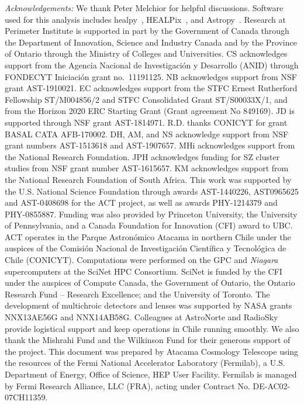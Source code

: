 \documentclass[preprint2]{aastex63}
\begin{document}
{\it{Acknowledgements:}} We thank Peter Melchior for helpful discussions.
Software used for this analysis includes healpy~\citep{Healpix1}, HEALPix~\citep{Healpix2}, and Astropy~\citep{astropy:2013, astropy:2018}.
Research at Perimeter Institute is supported in part by the Government of Canada through the Department of Innovation, Science and Industry Canada and by the Province of Ontario through the Ministry of Colleges and Universities. CS acknowledges support from the Agencia Nacional de Investigaci\'on y Desarrollo (ANID) through FONDECYT Iniciaci\'on grant no.~11191125. NB acknowledges support from NSF grant AST-1910021. EC acknowledges support from the STFC Ernest Rutherford Fellowship ST/M004856/2 and STFC Consolidated Grant ST/S00033X/1, and from the Horizon 2020 ERC Starting Grant (Grant agreement No 849169).
JD is supported through NSF grant AST-1814971. R.D. thanks CONICYT for grant BASAL CATA AFB-170002. DH, AM, and NS acknowledge support from NSF grant numbers AST-1513618 and AST-1907657.
 MHi acknowledges support from the National Research Foundation.
JPH acknowledges funding for SZ cluster studies from NSF grant number AST-1615657. KM acknowledges support from the National Research Foundation of South Africa. 
This work was supported by the U.S. National Science Foundation through awards AST-1440226, AST0965625 and AST-0408698 for the ACT project, as well as awards PHY-1214379 and PHY-0855887. Funding was also provided by Princeton University, the University of Pennsylvania, and a Canada Foundation for Innovation (CFI) award to UBC. ACT operates in the Parque Astron\'{o}mico Atacama in northern Chile under the auspices of the Comisi\'{o}n Nacional de Investigaci\'{o}n Cient\'{i}fica y Tecnol\'{o}gica de Chile (CONICYT). Computations were performed on the GPC and \emph{Niagara} supercomputers at the SciNet HPC Consortium. SciNet is funded by the CFI under the auspices of Compute Canada, the Government of Ontario, the Ontario Research Fund
-- Research Excellence; and the University of Toronto. The development of multichroic detectors and lenses was supported by NASA grants NNX13AE56G and NNX14AB58G.   Colleagues at AstroNorte and RadioSky provide logistical support and keep operations in Chile running smoothly. We also thank the Mishrahi Fund and the Wilkinson Fund for their generous support of the project. This document was prepared by Atacama Cosmology Telescope using the resources of the Fermi National Accelerator Laboratory (Fermilab), a U.S. Department of Energy, Office of Science, HEP User Facility. Fermilab is managed by Fermi Research Alliance, LLC (FRA), acting under Contract No. DE-AC02-07CH11359.
\end{document}
